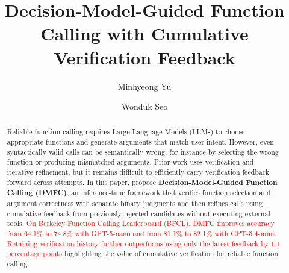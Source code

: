 \documentclass[sigconf,nonacm]{acmart}
\begin{document}
\title{Decision-Model-Guided Function Calling with Cumulative Verification Feedback}

\author{Minhyeong Yu}


\author{Wonduk Seo}
\correspondingauthor
{}



\renewcommand{\shortauthors}{Yu and Seo}

\begin{abstract}


Reliable function calling requires Large Language Models (LLMs) to choose appropriate functions and generate arguments that match user intent. However, even syntactically valid calls can be semantically wrong, for instance by selecting the wrong function or producing mismatched arguments. Prior work uses verification and iterative refinement, but it remains difficult to efficiently carry verification feedback forward across attempts. In this paper, propose \textbf{Decision-Model-Guided Function Calling (DMFC)}, an inference-time framework that verifies function selection and argument correctness with separate binary judgments and then refines calls using cumulative feedback from previously rejected candidates without executing external tools. \textcolor{red}{On Berkeley Function Calling Leaderboard (BFCL), DMFC improves accuracy from 64.1\% to 74.8\% with GPT-5-nano and from 81.1\% to 82.1\% with GPT-5.4-mini. Retaining verification history further outperforms using only the latest feedback by 1.1 percentage points} highlighting the value of cumulative verification for reliable function calling.
\end{abstract}





\maketitle
\raggedbottom
\end{document}
